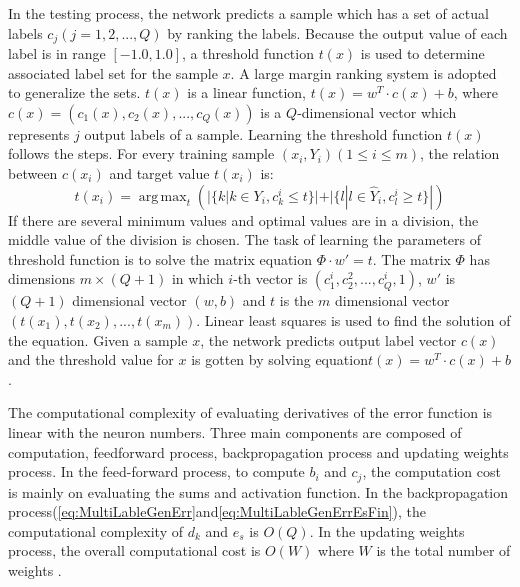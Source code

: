In the testing process, the network predicts a sample which has a set of actual labels $c_{j} (j = 1,2,...,Q)$ by ranking the labels. Because the output value of each label is in range $[-1.0,1.0]$, a threshold function $t(x)$ is used to determine associated label set for the sample $x$. A large margin ranking system\citep{elisseeff2001kernel} is adopted to generalize the sets. $t(x)$ is a linear function, $t(x) = w^T\cdot c(x) + b$, where $c(x) = (c_{1}(x), c_{2}(x),...,c_{Q}(x))$ is a $Q$-dimensional vector which represents $j$ output labels of a sample. Learning the threshold function $t(x)$ follows the steps. For every training sample $(x_{i}, Y_{i}) (1 \leq i \leq m)$, the relation between $c(x_{i})$ and target value $t(x_{i})$ is:
\begin{equation}\label{eq:MultiLableThreshFunc}
t(x_{i}) =  \operatorname{arg\,max}_t (|\{k|k \in Y_{i}, c_{k}^i \leq t\}| + |\{l|l \in \hat{Y}_{i}, c_{l}^i \geq t\}|) 
\end{equation}
If there are several minimum values and optimal values are in a division, the middle value of the division is chosen. The task of learning the parameters of threshold function is to solve the matrix equation $\Phi \cdot w' = t$. The matrix $\Phi$ has dimensions $m \times (Q + 1)$ in which $i$-th vector is $(c_{1}^i, c_{2}^2,...,c_{Q}^i,1)$, $w'$ is $(Q+1)$ dimensional vector $(w,b)$ and $t$ is the $m$ dimensional vector $(t(x_{1}), t(x_{2}),...,t(x_{m}))$. Linear least squares is used to find the solution of the equation. Given a sample $x$, the network predicts output label vector $c(x)$ and the threshold value for $x$ is gotten by solving equation$t(x) = w^T \cdot c(x) + b$.

The computational complexity of evaluating derivatives of the error function is linear with the neuron numbers. Three main components are composed of computation, feedforward process, backpropagation process and updating weights process. In the feed-forward process, to compute $b_{i}$ and $c_{j}$, the computation cost is mainly on evaluating the sums and activation function. In the backpropagation process(\ref{eq:MultiLableGenErr}and\ref{eq:MultiLableGenErrEsFin}), the computational complexity of $d_{k}$ and $e_{s}$ is $O(Q)$. In the updating weights process, the overall computational cost is $O(W)$ where $W$ is the total number of weights . 





















